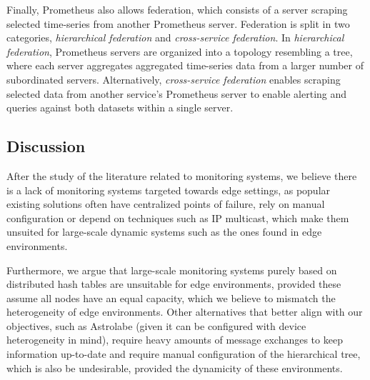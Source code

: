 Finally, Prometheus also allows federation, which consists of a server scraping selected time-series from another Prometheus server. Federation is split in two categories, \textit{hierarchical federation} and \textit{cross-service federation}. In \textit{hierarchical federation}, Prometheus servers are organized into a topology resembling a tree, where each server aggregates aggregated time-series data from a larger number of subordinated servers. Alternatively,  \textit{cross-service federation} enables scraping selected data from another service's Prometheus server to enable alerting and queries against both datasets within a single server. 

\subsection{Discussion}

After the study of the literature related to monitoring systems, we believe there is a lack of monitoring systems targeted towards edge settings, as popular existing solutions often have centralized points of failure, rely on manual configuration or depend on techniques such as IP multicast, which make them unsuited for large-scale dynamic systems such as the ones found in edge environments.

Furthermore, we argue that large-scale monitoring systems purely based on distributed hash tables \cite{SDIMS} are unsuitable for edge environments, provided these assume all nodes have an equal capacity, which we believe to mismatch the heterogeneity of edge environments. Other  alternatives that better align with our objectives, such as Astrolabe \cite{Renesse2003} (given it can be configured with device heterogeneity in mind), require heavy amounts of message exchanges to keep information up-to-date and require manual configuration of the hierarchical tree, which is also be undesirable, provided the dynamicity of these environments. 



